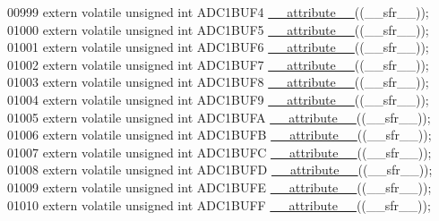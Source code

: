 \begin{DoxyCode}
00999 \textcolor{keyword}{extern} \textcolor{keyword}{volatile} \textcolor{keywordtype}{unsigned} \textcolor{keywordtype}{int}  ADC1BUF4 \hyperlink{a00009_a493c46f03454991ccc5aa7a6e1dfb2a7}{\_\_attribute\_\_}((\_\_sfr\_\_));
01000 \textcolor{keyword}{extern} \textcolor{keyword}{volatile} \textcolor{keywordtype}{unsigned} \textcolor{keywordtype}{int}  ADC1BUF5 \hyperlink{a00009_a493c46f03454991ccc5aa7a6e1dfb2a7}{\_\_attribute\_\_}((\_\_sfr\_\_));
01001 \textcolor{keyword}{extern} \textcolor{keyword}{volatile} \textcolor{keywordtype}{unsigned} \textcolor{keywordtype}{int}  ADC1BUF6 \hyperlink{a00009_a493c46f03454991ccc5aa7a6e1dfb2a7}{\_\_attribute\_\_}((\_\_sfr\_\_));
01002 \textcolor{keyword}{extern} \textcolor{keyword}{volatile} \textcolor{keywordtype}{unsigned} \textcolor{keywordtype}{int}  ADC1BUF7 \hyperlink{a00009_a493c46f03454991ccc5aa7a6e1dfb2a7}{\_\_attribute\_\_}((\_\_sfr\_\_));
01003 \textcolor{keyword}{extern} \textcolor{keyword}{volatile} \textcolor{keywordtype}{unsigned} \textcolor{keywordtype}{int}  ADC1BUF8 \hyperlink{a00009_a493c46f03454991ccc5aa7a6e1dfb2a7}{\_\_attribute\_\_}((\_\_sfr\_\_));
01004 \textcolor{keyword}{extern} \textcolor{keyword}{volatile} \textcolor{keywordtype}{unsigned} \textcolor{keywordtype}{int}  ADC1BUF9 \hyperlink{a00009_a493c46f03454991ccc5aa7a6e1dfb2a7}{\_\_attribute\_\_}((\_\_sfr\_\_));
01005 \textcolor{keyword}{extern} \textcolor{keyword}{volatile} \textcolor{keywordtype}{unsigned} \textcolor{keywordtype}{int}  ADC1BUFA \hyperlink{a00009_a493c46f03454991ccc5aa7a6e1dfb2a7}{\_\_attribute\_\_}((\_\_sfr\_\_));
01006 \textcolor{keyword}{extern} \textcolor{keyword}{volatile} \textcolor{keywordtype}{unsigned} \textcolor{keywordtype}{int}  ADC1BUFB \hyperlink{a00009_a493c46f03454991ccc5aa7a6e1dfb2a7}{\_\_attribute\_\_}((\_\_sfr\_\_));
01007 \textcolor{keyword}{extern} \textcolor{keyword}{volatile} \textcolor{keywordtype}{unsigned} \textcolor{keywordtype}{int}  ADC1BUFC \hyperlink{a00009_a493c46f03454991ccc5aa7a6e1dfb2a7}{\_\_attribute\_\_}((\_\_sfr\_\_));
01008 \textcolor{keyword}{extern} \textcolor{keyword}{volatile} \textcolor{keywordtype}{unsigned} \textcolor{keywordtype}{int}  ADC1BUFD \hyperlink{a00009_a493c46f03454991ccc5aa7a6e1dfb2a7}{\_\_attribute\_\_}((\_\_sfr\_\_));
01009 \textcolor{keyword}{extern} \textcolor{keyword}{volatile} \textcolor{keywordtype}{unsigned} \textcolor{keywordtype}{int}  ADC1BUFE \hyperlink{a00009_a493c46f03454991ccc5aa7a6e1dfb2a7}{\_\_attribute\_\_}((\_\_sfr\_\_));
01010 \textcolor{keyword}{extern} \textcolor{keyword}{volatile} \textcolor{keywordtype}{unsigned} \textcolor{keywordtype}{int}  ADC1BUFF \hyperlink{a00009_a493c46f03454991ccc5aa7a6e1dfb2a7}{\_\_attribute\_\_}((\_\_sfr\_\_));

\end{DoxyCode}
